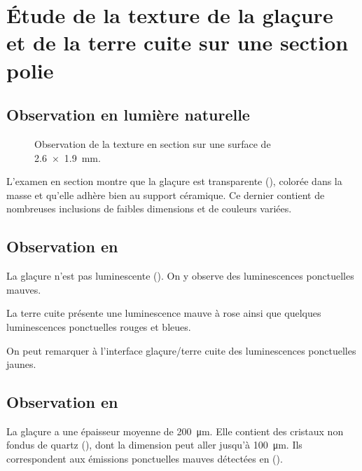\section{Étude de la texture de la glaçure et de la terre cuite sur 
         une section polie}

\subsection{Observation en lumière naturelle}
\begin{figure}[htb]
  \begin{minipage}[t]{0.4\textwidth}
  \end{minipage}
  \begin{minipage}[t]{0.4\textwidth}
    \subcaption{\CL \label{texture:6531_CL}}
  \end{minipage}
  \caption[\ -- Observation de la texture en section]
          {\legendeD 
           Observation de la texture en section sur une surface de 
           \SI{2.6x1.9}{\mm}.}
  \label{texture:6531}
\end{figure}

L'examen en section montre que la glaçure est transparente 
(), colorée dans la masse et qu'elle 
adhère bien au support céramique. Ce dernier contient de nombreuses 
inclusions de faibles dimensions et de couleurs variées.

\subsection{Observation en \CL}
La glaçure n'est pas luminescente (). 
On y observe des luminescences ponctuelles mauves.

La terre cuite présente une luminescence mauve à rose ainsi que 
quelques luminescences ponctuelles rouges et bleues.

On peut remarquer à l'interface glaçure/terre cuite des luminescences 
ponctuelles jaunes.

\subsection{Observation en \MEB[ie]}
La glaçure a une épaisseur moyenne de \SI{200}{\um}. Elle contient 
des cristaux non fondus de quartz (\quartz), dont la dimension peut 
aller jusqu'à \SI{100}{\um}. Ils correspondent aux émissions 
ponctuelles mauves détectées en \CL ().

